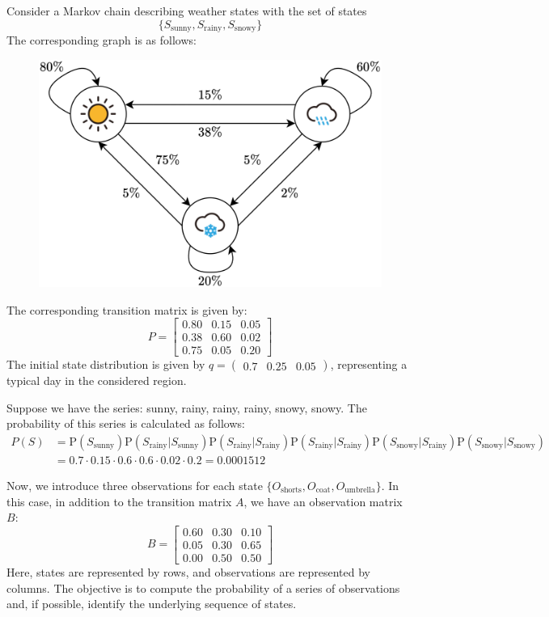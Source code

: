 \begin{example}
    Consider a Markov chain describing weather states with the set of states
    \[\{S_{\text{sunny}},S_{\text{rainy}},S_{\text{snowy}}\}\] 
    The corresponding graph is as follows: 
    \begin{figure}[H]
        \centering
        \includegraphics[width=0.4\linewidth]{images/hmm.png}
    \end{figure}
    The corresponding transition matrix is given by:
    \[P=
    \begin{bmatrix}
        0.80 & 0.15 & 0.05 \\
        0.38 & 0.60 & 0.02 \\
        0.75 & 0.05 & 0.20 
    \end{bmatrix}\]
    The initial state distribution is given by $q=\left(\begin{matrix} 0.7 & 0.25 & 0.05 \end{matrix}\right)$, representing a typical day in the considered region.

    Suppose we have the series: sunny, rainy, rainy, rainy, snowy, snowy. 
    The probability of this series is calculated as follows:
    \begin{align*}
        P(S)    &= \text{P} (S_{\text{sunny}})  \text{P} (S_{\text{rainy}}|S_{\text{sunny}})  \text{P} (S_{\text{rainy}}|S_{\text{rainy}})  \text{P} (S_{\text{rainy}}|S_{\text{rainy}})\text{P} (S_{\text{snowy}}|S_{\text{rainy}})  \text{P} (S_{\text{snowy}}|S_{\text{snowy}}) \\
                &= 0.7 \cdot 0.15 \cdot 0.6 \cdot 0.6 \cdot 0.02 \cdot 0.2 = 0.0001512
    \end{align*} 

    Now, we introduce three observations for each state $\{O_{\text{shorts}},O_{\text{coat}},O_{\text{umbrella}}\}$. 
    In this case, in addition to the transition matrix $A$, we have an observation matrix $B$: 
    \[B= 
    \begin{bmatrix}
        0.60 & 0.30 & 0.10 \\
        0.05 & 0.30 & 0.65 \\
        0.00 & 0.50 & 0.50 
    \end{bmatrix}\]
    Here, states are represented by rows, and observations are represented by columns. 
    The objective is to compute the probability of a series of observations and, if possible, identify the underlying sequence of states.
\end{example}

